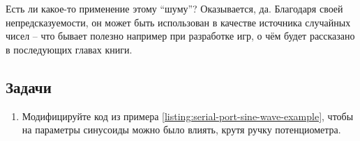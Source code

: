 \documentclass[../sparc.tex]{subfiles}
\begin{document}


Есть ли какое-то применение этому ``шуму''?  Оказывается, да.  Благодаря своей
непредсказуемости, он может быть использован в качестве источника случайных
чисел -- что бывает полезно например при разработке игр, о чём будет рассказано в
последующих главах книги.

\subsection{Задачи}

\begin{enumerate}
\item Модифицируйте код из примера \ref{listing:serial-port-sine-wave-example},
  чтобы на параметры синусоиды можно было влиять, крутя ручку потенциометра.
\end{enumerate}
\end{document}
